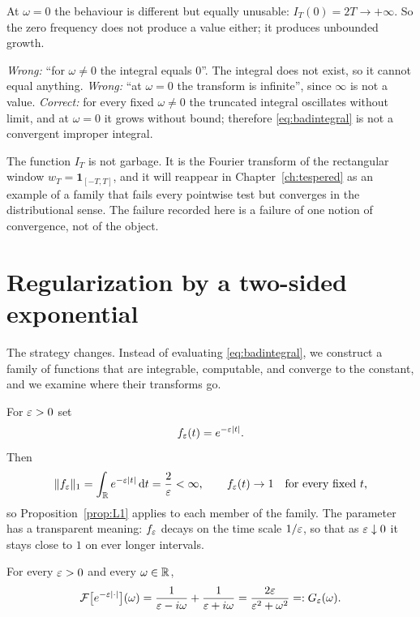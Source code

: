 At $\omega=0$ the behaviour is different but equally unusable: $I_{T}(0)=2T\to+\infty$. So the
zero frequency does not produce a value either; it produces unbounded growth.

\begin{remark}
\emph{Wrong:} ``for $\omega\neq0$ the integral equals $0$''. The integral does not exist, so it
cannot equal anything. \emph{Wrong:} ``at $\omega=0$ the transform is infinite'', since $\infty$ is
not a value. \emph{Correct:} for every fixed $\omega\neq0$ the truncated integral oscillates
without limit, and at $\omega=0$ it grows without bound; therefore \eqref{eq:badintegral} is not a
convergent improper integral.
\end{remark}

\begin{remark}\label{rem:sinc}
The function $I_{T}$ is not garbage. It is the Fourier transform of the rectangular window
$w_{T}=\mathbf{1}_{[-T,T]}$, and it will reappear in Chapter~\ref{ch:tespered} as an example of a
family that fails every pointwise test but converges in the distributional sense. The failure
recorded here is a failure of one notion of convergence, not of the object.
\end{remark}

\section{Regularization by a two-sided exponential}

The strategy changes. Instead of evaluating \eqref{eq:badintegral}, we construct a family of
functions that are integrable, computable, and converge to the constant, and we examine where their
transforms go.

For $\varepsilon>0$ set
\begin{equation}
f_{\varepsilon}(t)=e^{-\varepsilon|t|}.
\label{eq:feps}
\end{equation}
Then
\begin{equation}
\|f_{\varepsilon}\|_{1}=\int_{\mathbb{R}}e^{-\varepsilon|t|}\,\mathrm{d} t=\frac{2}{\varepsilon}<\infty,
\qquad
f_{\varepsilon}(t)\to1\quad\text{for every fixed }t,
\label{eq:feps-approx}
\end{equation}
so Proposition~\ref{prop:L1} applies to each member of the family. The parameter has a transparent
meaning: $f_{\varepsilon}$ decays on the time scale $1/\varepsilon$, so that as $\varepsilon\downarrow0$ it stays close to
$1$ on ever longer intervals.

\begin{theorem}\label{thm:exptransform}
For every $\varepsilon>0$ and every $\omega\in\mathbb{R}$,
\begin{equation}
\mathcal{F}\big[e^{-\varepsilon|\cdot|}\big](\omega)
=\frac{1}{\varepsilon-i\omega}+\frac{1}{\varepsilon+i\omega}
=\frac{2\varepsilon}{\varepsilon^{2}+\omega^{2}}
=:G_{\varepsilon}(\omega).
\label{eq:Geps}
\end{equation}
\end{theorem}

